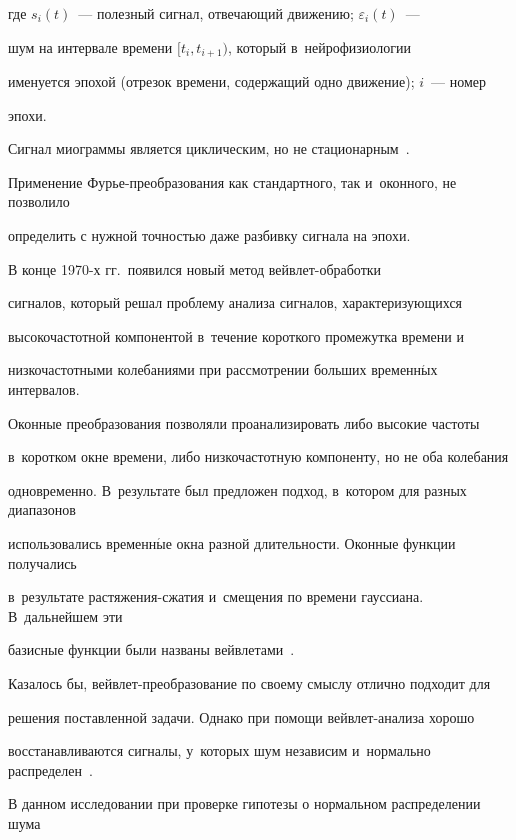 где $s_i(t)$~--- полезный сигнал, отвечающий движению; $\varepsilon_i(t)$~--- 

шум на интервале времени $\lbrack t_i,t_{i+1})$, который в~нейрофизиологии 

именуется эпохой (отрезок времени, содержащий одно движение); $i$~--- номер 

эпохи.



Сигнал миограммы является циклическим, но не стационарным~\cite{seven_authors}. 

Применение Фурье-пре\-обра\-зо\-ва\-ния как стандартного, так и~оконного, не позволило 

определить с нужной точностью даже разбивку сигнала на эпохи.



В конце 1970-х гг.\ появился новый метод вейв\-лет-обра\-бот\-ки 

сигналов, который  решал проблему анализа сигналов, характеризующихся 

высокочастотной компонентой в~течение короткого промежутка времени и~

низкочастотными колебаниями при рассмотрении больших временн$\acute{\mbox{ы}}$х интервалов. 

Оконные преобразования позволяли проанализировать либо высокие частоты 

в~коротком окне времени, либо низкочастотную компоненту, но не оба колебания 

одновременно. В~результате был предложен подход, в~котором для разных диапазонов  

использовались временн$\acute{\mbox{ы}}$е окна разной длительности. Оконные функции получались 

в~результате рас\-тя\-же\-ния-сжа\-тия и~смещения по времени гауссиана. В~дальнейшем эти 

базисные функции были названы вейвлетами~\cite{posobie_zah_shest}.



Казалось бы, вейвлет-преобразование по своему смыслу отлично подходит для 

решения поставленной задачи.  Однако при помощи вейв\-лет-ана\-ли\-за хорошо 

восстанавливаются сигналы, у~которых шум независим и~нормально распределен~\cite{posobie_zah_shest}.



В данном исследовании при проверке гипотезы о нормальном распределении шума 


